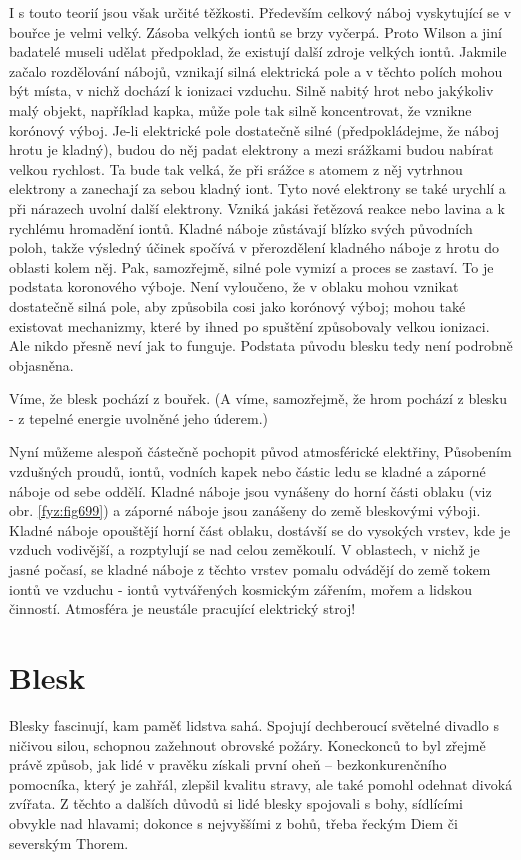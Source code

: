     I s touto teorií jsou však určité těžkosti. Především celkový náboj vyskytující se v bouřce je
    velmi velký. Zásoba velkých iontů se brzy vyčerpá. Proto Wilson a jiní badatelé museli udělat
    předpoklad, že existují další zdroje velkých iontů. Jakmile začalo rozdělování nábojů, vznikají
    silná elektrická pole a v těchto polích mohou být místa, v nichž dochází k ionizaci vzduchu.
    Silně nabitý hrot nebo jakýkoliv malý objekt, například kapka, může pole tak silně koncentrovat,
    že vznikne korónový výboj. Je-li elektrické pole dostatečně silné (předpokládejme, že náboj
    hrotu je kladný), budou do něj padat elektrony a mezi srážkami budou nabírat velkou rychlost. Ta
    bude tak velká, že při srážce s atomem z něj vytrhnou elektrony a zanechají za sebou kladný
    iont. Tyto nové elektrony se také urychlí a při nárazech uvolní další elektrony. Vzniká jakási
    řetězová reakce nebo lavina a k rychlému hromadění iontů. Kladné náboje zůstávají blízko svých
    původních poloh, takže výsledný účinek spočívá v přerozdělení kladného náboje z hrotu do oblasti
    kolem něj. Pak, samozřejmě, silné pole vymizí a proces se zastaví. To je podstata koronového
    výboje. Není vyloučeno, že v oblaku mohou vznikat dostatečně silná pole, aby způsobila cosi jako
    korónový výboj; mohou také existovat mechanizmy, které by ihned po spuštění způsobovaly velkou
    ionizaci. Ale nikdo přesně neví jak to funguje. Podstata původu blesku tedy není podrobně
    objasněna.

    Víme, že blesk pochází z bouřek. (A víme, samozřejmě, že hrom pochází z blesku - z tepelné
    energie uvolněné jeho úderem.)

    Nyní můžeme alespoň částečně pochopit původ atmosférické elektřiny, Působením vzdušných proudů,
    iontů, vodních kapek nebo částic ledu se kladné a záporné náboje od sebe oddělí. Kladné náboje
    jsou vynášeny do horní části oblaku (viz obr. \ref{fyz:fig699}) a záporné náboje jsou zanášeny
    do země bleskovými výboji. Kladné náboje opouštějí horní část oblaku, dostávší se do vysokých
    vrstev, kde je vzduch vodivější, a rozptylují se nad celou zeměkoulí. V oblastech, v nichž je
    jasné počasí, se kladné náboje z těchto vrstev pomalu odvádějí do země tokem iontů ve vzduchu -
    iontů vytvářených kosmickým zářením, mořem a lidskou činností. Atmosféra je neustále pracující
    elektrický stroj!

  \section{Blesk}\label{fyz:IIchapIXsecVI}   
    Blesky fascinují, kam paměť lidstva sahá. Spojují dechberoucí světelné divadlo s ničivou silou,
    schopnou zažehnout obrovské požáry. Koneckonců to byl zřejmě právě způsob, jak lidé v pravěku
    získali první oheň – bezkonkurenčního pomocníka, který je zahřál, zlepšil kvalitu stravy, ale
    také pomohl odehnat divoká zvířata. Z těchto a dalších důvodů si lidé blesky spojovali s bohy,
    sídlícími obvykle nad hlavami; dokonce s nejvyššími z bohů, třeba řeckým Diem či severským
    Thorem.

